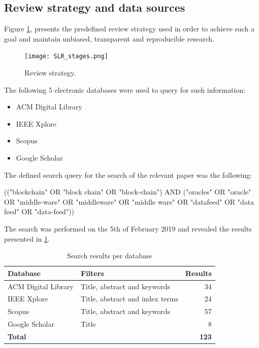 \subsection{Review strategy and data sources}
Figure \ref{fig:/figures/SLR_stages}, presents the predefined review strategy used in order to achieve such a goal and maintain unbiased, transparent and reproducible research.

\begin{figure}[t]
  \begin{center}
    \leavevmode
    \texttt{[image: SLR\_stages.png]}
    \caption{Review strategy.}
    \label{fig:/figures/SLR_stages}
  \end{center}
\end{figure}

The following 5 electronic databases were used to query for such information:

\begin{itemize}
\item ACM Digital Library
\item IEEE Xplore
\item Scopus
\item Google Scholar
\end{itemize}

The defined search query for the search of the relevant paper was the following:

(("blockchain" OR "block chain" OR "block-chain") 
AND 
("oracles" OR "oracle" OR "middle-ware" OR "middleware" OR "middle ware" OR "datafeed" OR "data feed" OR "data-feed"))

The search was performed on the 5th of February 2019 and revealed the results presented in \ref{search-results-table}.

\begin{table}[H]
\centering
\begin{tabular}{llr}
\hline
\textbf{Database} & \textbf{Filters} & \textbf{Results} \\ \hline
ACM Digital Library & Title, abstract and keywords & 34 \\
IEEE Xplore & Title, abstract and index terms & 24 \\
Scopus & Title, abstract and keywords & 57 \\
Google Scholar & Title & 8 \\ \hline
\textbf{Total} & \textbf{} & \textbf{123} \\ \hline
\end{tabular}
\caption{Search results per database}
\label{search-results-table}
\end{table}

